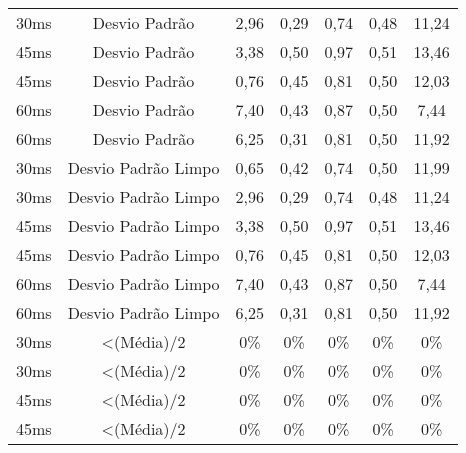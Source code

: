 \begin{table}[]
\begin{tabular}{|c|c|ccccc|}
30ms              & Desvio Padrão       & 2,96              & 0,29              & 0,74              & 0,48              & 11,24             \\
45ms              & Desvio Padrão       & 3,38              & 0,50              & 0,97              & 0,51              & 13,46             \\
45ms              & Desvio Padrão       & 0,76              & 0,45              & 0,81              & 0,50              & 12,03             \\
60ms              & Desvio Padrão       & 7,40              & 0,43              & 0,87              & 0,50              & 7,44              \\
60ms              & Desvio Padrão       & 6,25              & 0,31              & 0,81              & 0,50              & 11,92             \\ \hline
30ms              & Desvio Padrão Limpo & 0,65              & 0,42              & 0,74              & 0,50              & 11,99             \\
30ms              & Desvio Padrão Limpo & 2,96              & 0,29              & 0,74              & 0,48              & 11,24             \\
45ms              & Desvio Padrão Limpo & 3,38              & 0,50              & 0,97              & 0,51              & 13,46             \\
45ms              & Desvio Padrão Limpo & 0,76              & 0,45              & 0,81              & 0,50              & 12,03             \\
60ms              & Desvio Padrão Limpo & 7,40              & 0,43              & 0,87              & 0,50              & 7,44              \\
60ms              & Desvio Padrão Limpo & 6,25              & 0,31              & 0,81              & 0,50              & 11,92             \\ \hline
30ms              & \textless (Média)/2 & 0\%            & 0\%            & 0\%            & 0\%            & 0\%            \\
30ms              & \textless (Média)/2 & 0\%            & 0\%            & 0\%            & 0\%            & 0\%            \\
45ms              & \textless (Média)/2 & 0\%            & 0\%            & 0\%            & 0\%            & 0\%            \\
45ms              & \textless (Média)/2 & 0\%            & 0\%            & 0\%            & 0\%            & 0\%            \\

\end{tabular}
\end{table}
